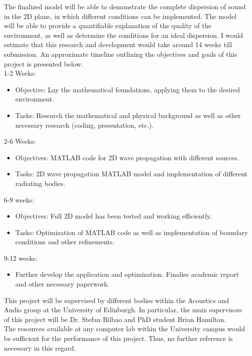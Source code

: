 The finalized model will be able to demonstrate the complete dispersion of sound in the 2D plane, in which different conditions can be implemented. The model will be able to provide a quantifiable explanation of the quality of the environment, as well as determine the conditions for an ideal dispersion. 
I would estimate that this research and development would take around 14 weeks till submission. An approximate timeline outlining the objectives and goals of this project is presented below.\\  
1-2 Weeks:
\begin{itemize} 
	\item Objective: Lay the mathematical foundations, applying them to the desired environment.
	\item Tasks: Research the mathematical and physical background as well as other necessary research (coding, presentation, etc.).
\end{itemize}
2-6 Weeks: 
\begin{itemize}
	\item Objectives: MATLAB code for 2D wave propagation with different sources.
	\item Tasks: 2D wave propagation MATLAB model and implementation of different radiating bodies.
\end{itemize}
6-9 weeks:
\begin{itemize}
	\item Objectives: Full 2D model has been tested and working efficiently.
	\item Tasks: Optimization of MATLAB code as well as implementation of boundary conditions and other refinements.
\end{itemize}
9-12 weeks:
\begin{itemize}
	\item Further develop the application and optimization. Finalise academic report and other necessary paperwork.
\end{itemize}
This project will be supervised by different bodies within the Acoustics and Audio group at the University of Edinburgh. In particular, the main supervisors of this project will be Dr. Stefan Bilbao and PhD student Brian Hamilton.\\
The resources available at any computer lab within the University campus would be sufficient for the performance of this project. Thus, no further reference is necessary in this regard. 
